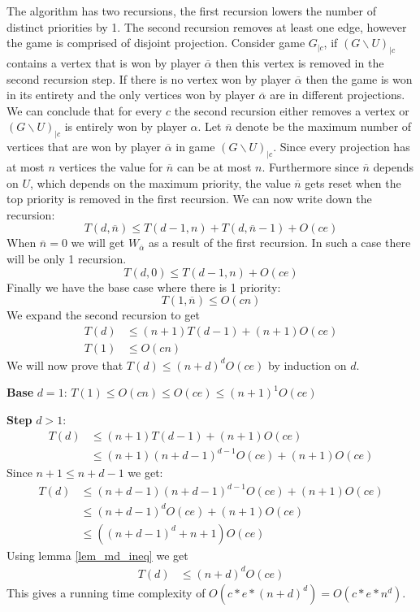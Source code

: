 The algorithm has two recursions, the first recursion lowers the number of distinct priorities by 1. The second recursion removes at least one edge, however the game is comprised of disjoint projection. Consider game $G_{|c}$, if $(G\backslash U)_{|c}$ contains a vertex that is won by player $\overline{\alpha}$ then this vertex is removed in the second recursion step. If there is no vertex won by player $\overline{\alpha}$ then the game is won in its entirety and the only vertices won by player $\overline{\alpha}$ are in different projections. We can conclude that for every $c$ the second recursion either removes a vertex or $(G\backslash U)_{|c}$ is entirely won by player $\alpha$. Let $\overline{n}$ denote be the maximum number of vertices that are won by player $\overline{\alpha}$ in game $(G\backslash U)_{|c}$. Since every projection has at most $n$ vertices the value for $\overline{n}$ can be at most $n$. Furthermore since $\overline{n}$ depends on $U$, which depends on the maximum priority, the value $\overline{n}$ gets reset when the top priority is removed in the first recursion. We can now write down the recursion:
\[ T(d,\overline{n}) \leq T(d-1,n) + T(d, \overline{n} - 1) + O(ce) \]
When $\overline{n} = 0$ we will get $W_{\overline{\alpha}}$ as a result of the first recursion. In such a case there will be only 1 recursion.
\[ T(d,0) \leq T(d-1,n) + O(ce) \]
Finally we have the base case where there is 1 priority:
\[ T(1, \overline{n}) \leq O(cn) \]
We expand the second recursion to get
\begin{align*}
T(d) &\leq (n+1)T(d-1) + (n+1)O(ce)\\
T(1) &\leq O(cn)
\end{align*}
We will now prove that $T(d) \leq (n+d)^dO(ce)$ by induction on $d$.

\textbf{Base} $d=1$: $T(1) \leq O(cn) \leq O(ce) \leq (n+1)^1O(ce)$

\textbf{Step} $d > 1$:
\begin{align*}
T(d) &\leq (n+1)T(d-1) + (n+1)O(ce)\\
&\leq (n+1)(n+d-1)^{d-1}O(ce) + (n+1)O(ce)
\end{align*}
Since $n+1 \leq n+d-1$ we get:
\begin{align*}
T(d) &\leq (n+d-1)(n+d-1)^{d-1}O(ce) + (n+1)O(ce)\\
&\leq (n+d-1)^dO(ce) + (n+1)O(ce)\\
&\leq ((n+d-1)^d + n + 1)O(ce)
\end{align*}
Using lemma \ref{lem_md_ineq} we get
\begin{align*}
T(d) &\leq (n+d)^dO(ce)
\end{align*}
This gives a running time complexity of $O(c*e*(n+d)^d) = O(c*e*n^d)$.




